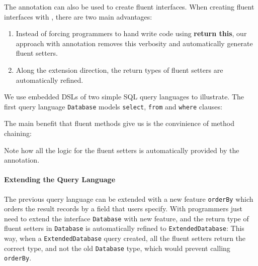 The \mixin annotation can also be used to create fluent interfaces. 
When creating fluent interfaces with \mixin, there are two main advantages:
\begin{enumerate}
\item Instead of forcing programmers to hand write code using \textbf{return
    this}, our approach with \mixin annotation removes this verbosity and
  automatically generate fluent setters.
\item Along the extension direction, the return types of fluent setters are
  automatically refined.
\end{enumerate} 

\noindent We use embedded DSLs of two simple SQL query languages to illustrate.
The first query language \texttt{Database}  models
\texttt{select}, \texttt{from} and \texttt{where} clauses:

\noindent The main benefit that fluent methods give
us is the convinience of method chaining:


\noindent Note how all the logic for the fluent setters is automatically provided by the \mixin annotation. 

\paragraph{Extending the Query Language} The previous query language can be extended with a new feature
\texttt{orderBy} which orders the result records by a field that users
specify. With \mixin programmers just need to extend the interface \texttt{Database} with new
feature, and the return type of fluent setters in
\texttt{Database} is automatically refined to \texttt{ExtendedDatabase}:
This way, when a \texttt{ExtendedDatabase} query created, 
all the fluent setters return the correct type, and not the old \texttt{Database} type, which would prevent calling 
\texttt{orderBy}.



